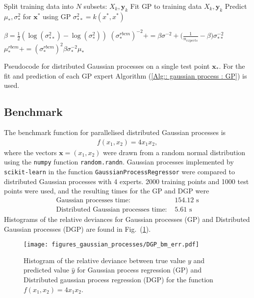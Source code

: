 \documentclass[twoside,english]{uiofysmaster}
\begin{document}
\begin{algorithm}
Split training data into $N$ subsets: $X_k, \textbf{y}_k$\;
{
Fit GP to training data $X_k, \textbf{y}_k$ \;
 Predict $\mu_*,\sigma_*^2 $ for $\textbf{x}^*$ using GP \;
 $\sigma_{**}^2 = k (x^*, x^*)$ \;
}
 
{ 
$\beta = \frac{1}{2} (\log (\sigma_{**}^2) - \log (\sigma_*^2))$ \;
$(\sigma_*^{rbcm})^{-2} += \beta \sigma^{-2} + \big(\frac{1}{n_{experts}} - \beta \big) \sigma_{**}^{-2} $ 
 }  
{ 
$\mu_*^{rbcm} += (\sigma_*^{rbcm})^2 \beta \sigma^{-2}_* \mu_*$
} 
 \caption{Pseudocode for distributed Gaussian processes on a single test point $\textbf{x}_*$. For the fit and prediction of each GP expert Algorithm (\ref{Alg:: gaussian process : GP}) is used.}
\label{Alg:: gaussian process : DGP}
\end{algorithm}

\subsection{Benchmark}

The benchmark function for parallelised distributed Gaussian processes is
\begin{align*}
f(x_1, x_2) =  4x_1x_2,
\end{align*}
where the vectors $\textbf{x} = (x_1, x_2)$ were drawn from a random normal distribution using the \verb|numpy| function \verb|random.randn|. Gaussian processes implemented by \verb|scikit-learn| in the function \verb|GaussianProcessRegressor| were compared to distributed Gaussian processes with 4 experts. 2000 training points and 1000 test points were used, and the resulting times for the GP and DGP were
\begin{align}
\text{Gaussian processes time: }& 154.12 \text{ s}\\
\text{Distributed Gaussian processes time: }& 5.61 \text{ s}
\end{align}
Histograms of the relative deviances for Gaussian processes (GP) and Distributed Gaussian processes (DGP) are found in Fig.\ (\ref{Fig:: gaussian process : DGP BM error histogram}).

\begin{figure}
\centering
\texttt{[image: figures\_gaussian\_processes/DGP\_bm\_err.pdf]}
\caption{Histogram of the relative deviance between true value $y$ and predicted value $\hat{y}$ for Gaussian process regression (GP) and Distributed gaussian process regression (DGP) for the function $f(x_1,x_2) = 4x_1 x_2$.}
\label{Fig:: gaussian process : DGP BM error histogram}
\end{figure}
\end{document}
